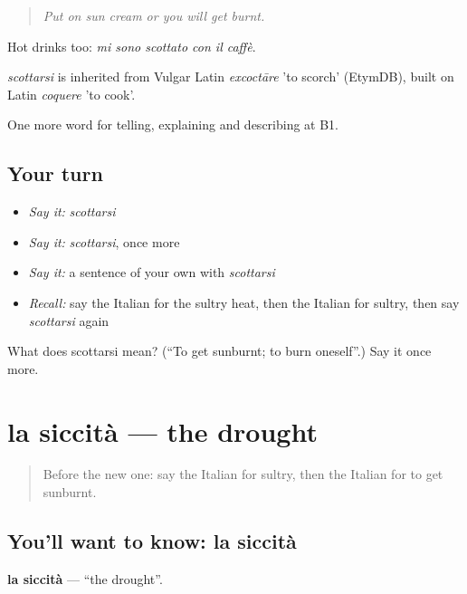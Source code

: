 \begin{quote}
\emph{Put on sun cream or you will get burnt.}
\end{quote}

Hot drinks too: \emph{mi sono scottato con il caffè}.

\begin{cousinweb}
\emph{scottarsi} is inherited from Vulgar Latin \emph{excoctāre} 'to scorch' (EtymDB), built on Latin \emph{coquere} 'to cook'.
\end{cousinweb}

\begin{grammarlens}[title={What you've built}]
One more word for telling, explaining and describing at B1.
\end{grammarlens}

\subsection*{Your turn}
\begin{itemize}
\raggedright
  \item \emph{Say it:} \emph{scottarsi}
  \item \emph{Say it:} \emph{scottarsi}, once more
  \item \emph{Say it:} a sentence of your own with \emph{scottarsi}
  \item \emph{Recall:} say the Italian for the sultry heat, then the Italian for sultry, then say \emph{scottarsi} again
\end{itemize}

\begin{tcolorbox}[breakable,colback=teal!4,colframe=teal!35!black,title={Before you move on}]
What does scottarsi mean? (\textquotedblleft{}To get sunburnt; to burn oneself\textquotedblright{}.) Say it once more.
\end{tcolorbox}
\section[la siccità]{la siccità — the drought}

\label{lesson:IT-C466-siccita}



\begin{quote}
Before the new one: say the Italian for sultry, then the Italian for to get sunburnt.
\end{quote}

\subsection*{You'll want to know: la siccità}
\textbf{la siccità} — \textquotedblleft{}the drought\textquotedblright{}.

